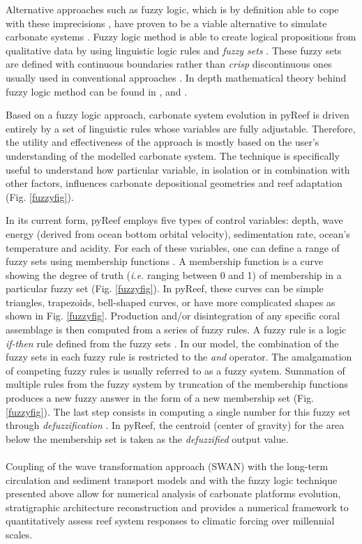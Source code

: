 \documentclass[default,jgrga]{agutex2015}
\begin{document}
\begin{article}
Alternative approaches such as fuzzy logic, which is by definition able to cope with these imprecisions \citep{Demicco01, Collin15}, have proven to be a viable alternative to simulate carbonate systems \citep{Salles11, Hattab13}. Fuzzy logic method is able to create logical propositions from qualitative data by using linguistic logic rules and \textit{fuzzy sets} \citep{Nordlund96}. These fuzzy sets are defined with continuous boundaries rather than \textit{crisp} discontinuous ones usually used in conventional approaches \citep{Meesters98}. In depth mathematical theory behind fuzzy logic method can be found in \citet{Zadeh65}, \citet{Zimmerman91} and \citet{Berkan97}.

\noindent Based on a fuzzy logic approach, carbonate system evolution in pyReef is driven entirely by a set of linguistic rules whose variables are fully adjustable. Therefore, the utility and effectiveness of the approach is mostly based on the user's understanding of the modelled carbonate system. The technique is specifically useful to understand how particular variable, in isolation or in combination with other factors, influences carbonate depositional geometries and reef adaptation (Fig. \ref{fuzzyfig}).

In its current form, pyReef employs five types of control variables: depth, wave energy (derived from ocean bottom orbital velocity), sedimentation rate, ocean's temperature and acidity. For each of these variables, one can define a range of fuzzy sets using membership functions \citep{Nordlund99}. A membership function is a curve showing the degree of truth (\textit{i.e.} ranging between 0 and 1) of membership in a particular fuzzy set (Fig. \ref{fuzzyfig}). In pyReef, these curves can be simple triangles, trapezoids, bell-shaped curves, or have more complicated shapes as shown in Fig. \ref{fuzzyfig}. Production and/or disintegration of any specific coral assemblage is then computed from a series of fuzzy rules. A fuzzy rule is a logic \textit{if-then} rule defined from the fuzzy sets \citep{Demicco01}. In our model, the combination of the fuzzy sets in each fuzzy rule is restricted to the \textit{and} operator. The amalgamation of competing fuzzy rules is usually referred to as a fuzzy system. Summation of multiple rules from the fuzzy system by truncation of the membership functions produces a new fuzzy answer in the form of a new membership set (Fig. \ref{fuzzyfig}). The last step consists in computing a single number for this fuzzy set through \textit{defuzzification} \citep{Zadeh65}. In pyReef, the centroid (center of gravity) for the area below the membership set is taken as the \textit{defuzzified} output value.
\\
\\
Coupling of the wave transformation approach (SWAN) with the long-term circulation and sediment transport models and with the fuzzy logic technique presented above allow for numerical analysis of carbonate platforms evolution, stratigraphic architecture reconstruction and provides a numerical framework to quantitatively assess reef system responses to climatic forcing over millennial scales.


\end{article}
\end{document}
